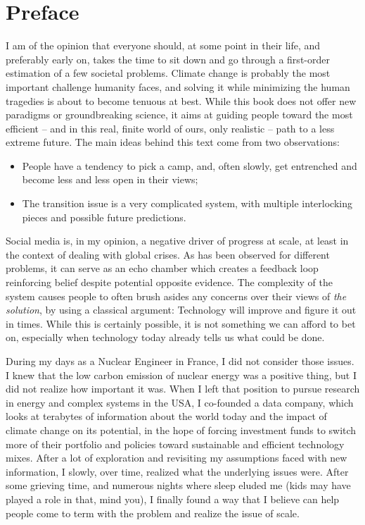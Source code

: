 \chapter*{Preface}

I am of the opinion that everyone should, at some point in their life, and preferably early on, takes the time to sit down and go through a first-order estimation of a few societal problems. Climate change is probably the most important challenge humanity faces, and solving it while minimizing the human tragedies is about to become tenuous at best. While this book does not offer new paradigms or groundbreaking science, it aims at guiding people toward the most efficient -- and in this real, finite world of ours, only realistic -- path to a less extreme future. The main ideas behind this text come from two observations:

\begin{itemize}
	\item People have a tendency to pick a camp, and, often slowly, get entrenched and become less and less open in their views;
	\item The transition issue is a very complicated system, with multiple interlocking pieces and possible future predictions.
\end{itemize}

Social media is, in my opinion, a negative driver of progress at scale, at least in the context of dealing with global crises. As has been observed for different problems, it can serve as an echo chamber which creates a feedback loop reinforcing belief despite potential opposite evidence. The complexity of the system causes people to often brush asides any concerns over their views of \emph{the solution}, by using a classical argument: Technology will improve and figure it out in times. While this is certainly possible, it is not something we can afford to bet on, especially when technology today already tells us what could be done.

During my days as a Nuclear Engineer in France, I did not consider those issues. I knew that the low carbon emission of nuclear energy was a positive thing, but I did not realize how important it was. When I left that position to pursue research in energy and complex systems in the USA, I co-founded a data company, which looks at terabytes of information about the world today and the impact of climate change on its potential, in the hope of forcing investment funds to switch more of their portfolio and policies toward sustainable and efficient technology mixes. After a lot of exploration and revisiting my assumptions faced with new information, I slowly, over time, realized what the underlying issues were. After some grieving time, and numerous nights where sleep eluded me (kids may have played a role in that, mind you), I finally found a way that I believe can help people come to term with the problem and realize the issue of scale.

